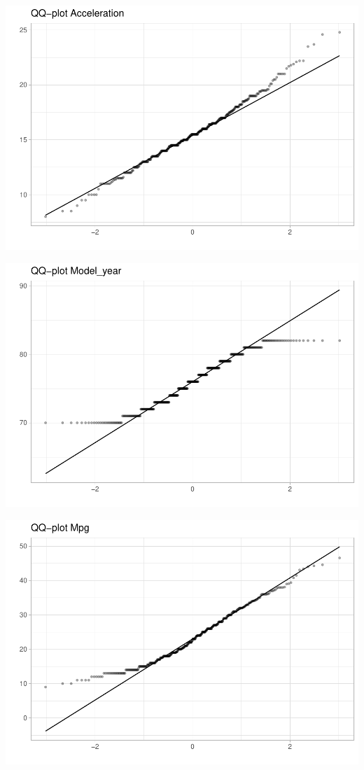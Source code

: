 \begin{center}\includegraphics{img/EDA_files/figure-latex/unnamed-chunk-14-4} \end{center}

\begin{center}\includegraphics{img/EDA_files/figure-latex/unnamed-chunk-14-5} \end{center}

\begin{center}\includegraphics{img/EDA_files/figure-latex/unnamed-chunk-14-6} \end{center}

